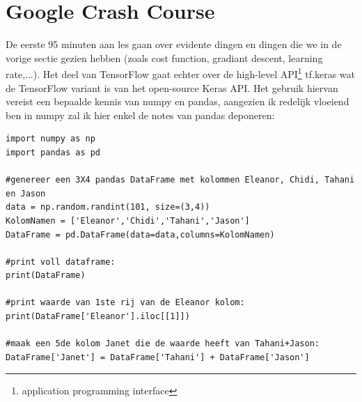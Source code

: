 \documentclass[10pt,a4paper,twoside]{article}
\begin{document}
\section{Google Crash Course}
De eerste 95 minuten aan les gaan over evidente dingen en dingen die we in de vorige sectie gezien hebben (zoals cost function, gradiant descent, learning rate,...). Het deel van TensorFlow gaat echter over de high-level API\footnote{application programming interface} tf.keras wat de TensorFlow variant is van het open-source Keras API. Het gebruik hiervan vereist een bepaalde kennis van numpy en pandas, aangezien ik redelijk vloeiend ben in numpy zal ik hier enkel de notes van pandas deponeren:
\begin{verbatim}
import numpy as np
import pandas as pd

#genereer een 3X4 pandas DataFrame met kolommen Eleanor, Chidi, Tahani en Jason
data = np.random.randint(101, size=(3,4))
KolomNamen = ['Eleanor','Chidi','Tahani','Jason']
DataFrame = pd.DataFrame(data=data,columns=KolomNamen)

#print voll dataframe:
print(DataFrame)

#print waarde van 1ste rij van de Eleanor kolom:
print(DataFrame['Eleanor'].iloc[[1]])

#maak een 5de kolom Janet die de waarde heeft van Tahani+Jason:
DataFrame['Janet'] = DataFrame['Tahani'] + DataFrame['Jason']                                                  
\end{verbatim}

\newpage


\end{document}
